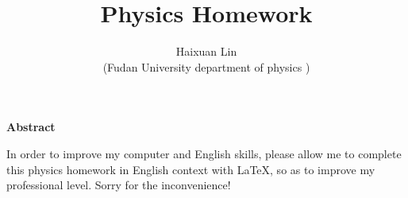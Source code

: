 \documentclass[12pt,a4paper]{article}%
\title{\fontsize{18pt}{27pt}\selectfont%
	{\heiti%
		Physics Homework}}%
\author{\fontsize{12pt}{18pt}\selectfont%
	{\fangsong%
		Haixuan Lin}\\%
	\fontsize{10.5pt}{15.75pt}\selectfont%
	{\fangsong%
		(Fudan University department of physics
		)}}%
\date{}%
\begin{document}
	\maketitle%
	\lhead{}%
	\chead{}%
	\rhead{}%
	\lfoot{}%
	\cfoot{\thepage}%
	\rfoot{}%
	
	
	\begin{center}%
		{\textbf{Abstract}}%
	\end{center}
	\begin{adjustwidth}{1.06cm}{1.06cm}%
		\hspace{1.5em}In order to improve my computer and English skills, please allow me to complete this physics homework in English context with \LaTeX, so as to improve my professional level. Sorry for the inconvenience!
	\end{adjustwidth}
	
	\newpage%
	
	\renewcommand{\contentsname}{Contents}
	\tableofcontents
	\newpage
	
\end{document}

